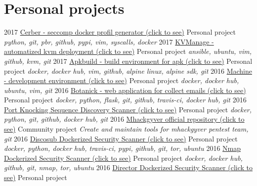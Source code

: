 \documentclass[]{friggeri-cv}
\begin{document}
\newpage

\section{Personal projects}
\begin{entrylist}
    \entry
        {2017}
        {\href{https://github.com/gr0und-s3ct0r/cerber}{Cerber - seccomp docker profil generator (click to see)}}
        {Personal project}
        {\emph{python, git, pbr, github, pypi, vim, syscalls, docker}}
    \entry
        {2017}
        {\href{https://github.com/sweet-sinatra/ubuntu-install/tree/master/ansible}{KVManage - automatized kvm deployment (click to see)}}
        {Personal project}
        {\emph{ansible, ubuntu, vim, github, kvm, git}}
    \entry
        {2017}
        {\href{https://github.com/gr0und-s3ct0r/apkbuild}{Apkbuild - build environment for apk (click to see)}}
        {Personal project}
        {\emph{docker, docker hub, vim, github, alpine linux, alpine sdk, git}}
    \entry
        {2016}
        {\href{https://github.com/4383/machine}{Machine - development environment (click to see)}}
        {Personal project}
        {\emph{docker, docker hub, ubuntu, vim, git}}
    \entry
        {2016}
        {\href{https://github.com/4383/Botanick}{Botanick - web application for collect emails (click to see)}}
        {Personal project}
        {\emph{docker, python, flask, git, github, travis-ci, docker hub, git}}
    \entry
        {2016}
        {\href{https://github.com/mhackgyver-squad/porno-king}{Port Knocking Sequence Discovery Scanner (click to see)}}
        {Personal project}
        {\emph{docker, python, git, github, docker hub, git}}
    \entry
        {2016}
        {\href{https://github.com/mhackgyver-squad/mhackgyver}{Mhackgyver official repository (click to see)}}
        {Community project}
        {\emph{Create and maintain tools for mhackgyver pentest team, git}}
    \entry
        {2016}
        {\href{https://hub.docker.com/r/4383/discosub}{Discosub Dockerized Security Scanner (click to see)}}
        {Personal project}
        {\emph{docker, python, docker hub, travis-ci, pypi, github, git, tor, ubuntu}}
    \entry
        {2016}
        {\href{https://hub.docker.com/r/4383/system-service-footprint}{Nmap Dockerized Security Scanner (click to see)}}
        {Personal project}
        {\emph{docker, docker hub, github, git, nmap, tor, ubuntu}}
    \entry
        {2016}
        {\href{https://hub.docker.com/r/4383/director}{Director Dockerized Security Scanner (click to see)}}
        {Personal project}

\end{entrylist}
\end{document}
